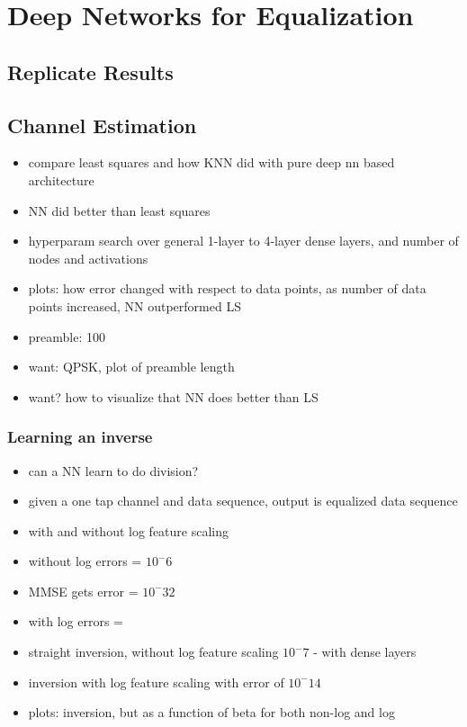 \chapter{Deep Networks for Equalization}


\section{Replicate Results}

\section{Channel Estimation}

\begin{itemize}
\item compare least squares and how KNN did with pure deep nn based architecture
\item NN did better than least squares
\item hyperparam search over general 1-layer to 4-layer dense layers, and number of nodes and activations
\item plots: how error changed with respect to data points, as number of data points increased, NN outperformed LS
\item preamble: 100
\item want: QPSK, plot of preamble length
\item want? how to visualize that NN does better than LS
\end{itemize}

\subsection{Learning an inverse}
\begin{itemize}
\item can a NN learn to do division?
\item given a one tap channel and data sequence, output is equalized data sequence
\item with and without log feature scaling
\item without log errors = $10^-6$
\item MMSE gets error = $10^-32$
\item with log errors = 
\item straight inversion, without log feature scaling $10^-7$ - with dense layers
\item inversion with log feature scaling with error of $10^-14$ 
\item plots: inversion, but as a function of beta for both non-log and log
\end{itemize}

